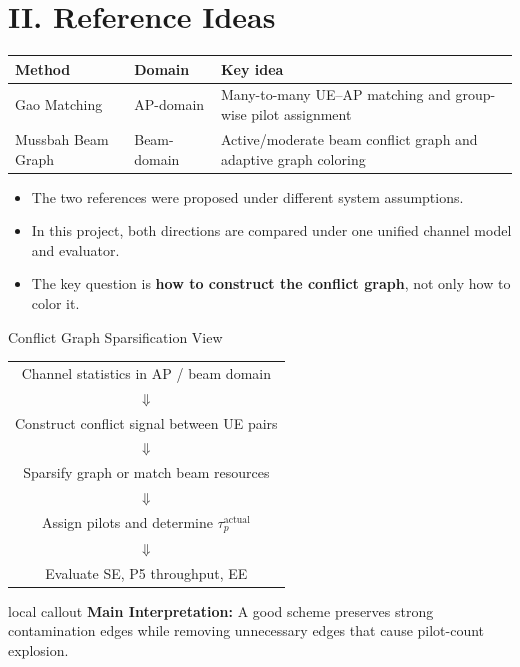 \documentclass[aspectratio=169, 10pt]{beamer}
\newcommand{\tauactual}{\tau_p^{\mathrm{actual}}}
\newcommand{\slidecallout}[2]{%
    \vspace{0.08cm}%
    \begin{beamercolorbox}[wd=\linewidth,sep=0.55ex,leftskip=0.8ex,rightskip=0.8ex,rounded=true]{local callout}
        \small{\color{ku_crimson}\bfseries #1:} #2
    \end{beamercolorbox}%
}
\begin{document}
\section{II. Reference Ideas}
\OnlyTitle
\begin{frame}{\insertsectionhead}
    \begin{table}
        \centering
        \small
        \begin{tabular}{p{}p{}p{}}
            \toprule
            Method & Domain & Key idea \\
            \midrule
            Gao Matching & AP-domain & Many-to-many UE--AP matching and group-wise pilot assignment \\
            Mussbah Beam Graph & Beam-domain & Active/moderate beam conflict graph and adaptive graph coloring \\
            \bottomrule
        \end{tabular}
    \end{table}

    \vspace{0.3cm}
    \begin{itemize}
        \setlength{\itemsep}{0.8em}
        \item The two references were proposed under different system assumptions.
        \item In this project, both directions are compared under one unified channel model and evaluator.
        \item The key question is \textbf{how to construct the conflict graph}, not only how to color it.
    \end{itemize}
\end{frame}

\begin{frame}{Conflict Graph Sparsification View}
    \centering
    \begin{tabular}{c}
        Channel statistics in AP / beam domain \\
        \(\Downarrow\) \\
        Construct conflict signal between UE pairs \\
        \(\Downarrow\) \\
        Sparsify graph or match beam resources \\
        \(\Downarrow\) \\
        Assign pilots and determine \(\tauactual\) \\
        \(\Downarrow\) \\
        Evaluate SE, P5 throughput, EE
    \end{tabular}

    \vspace{0.4cm}
    \slidecallout{Main Interpretation}{A good scheme preserves strong contamination edges while removing unnecessary edges that cause pilot-count explosion.}
\end{frame}
\end{document}
